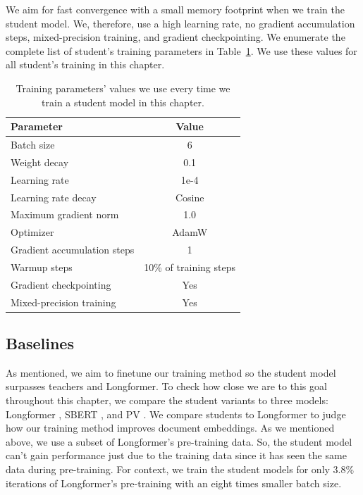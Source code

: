 We aim for fast convergence with a small
memory footprint when we train the student model. We, therefore, use a high learning rate, no gradient accumulation
steps, mixed-precision training, and gradient checkpointing. We enumerate the
complete list of student's training parameters in
Table~\ref{table:student_train_params}. We use these values for all student's
training in this chapter.


\begin{table}
  \centering
  \footnotesize

  \begin{tabular}{l c}
    \toprule
    Parameter & Value \\
    \midrule
    Batch size & 6 \\
    Weight decay & 0.1 \\
    Learning rate & 1e-4 \\
    Learning rate decay & Cosine \\
    Maximum gradient norm & 1.0 \\
    Optimizer & AdamW \\
    Gradient accumulation steps & 1 \\
    Warmup steps & 10\% of training steps \\
    Gradient checkpointing & Yes \\
    Mixed-precision training & Yes \\
    \bottomrule
  \end{tabular}

  \caption{Training parameters' values we use every time we train a student model in this chapter.}

  \label{table:student_train_params}

\end{table}

\subsection{Baselines}

As mentioned, we aim to finetune our training
method so the student model surpasses teachers and Longformer. To check
how close we are to this goal throughout this chapter, we compare the student
variants to three models: Longformer \citep{beltagy2020longformer}, SBERT
\citep{reimers2019sentence}, and PV \citep{le2014distributed}. We compare
students to Longformer to judge how our training method improves document
embeddings. As we mentioned above, we use a subset of Longformer's pre-training
data. So, the student model can't gain performance just due to
the training data since it has seen the same data during
pre-training. For context, we train the student models for only 3.8\%
iterations of Longformer's pre-training with an eight times smaller batch size.

